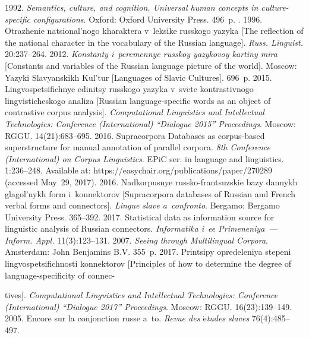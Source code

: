 \begin{multicols}{2}
{{\begin{thebibliography}{99}
   1992. \textit{Semantics, culture, and cognition. Universal 
human concepts in culture-specific configurations}. Oxford: Oxford University Press. 
496~p.
. 1996. Otrazhenie natsional'nogo 
kharaktera v~leksike russkogo yazyka [The reflection of the national character in the 
vocabulary of the Russian language]. \textit{Russ. Linguist.} 20:237--264.
   2012. 
\textit{Konstanty i~peremennye russkoy yazykovoy kartiny mira} [Constants and 
variables of the Russian language picture of the world]. Moscow: Yazyki 
Slavyanskikh Kul'tur [Languages of Slavic Cultures]. 696~p.
   2015. Lingvospetsifichnye edinitsy russkogo yazyka 
v~svete kontrastivnogo lingvisticheskogo analiza [Russian language-specific words 
as an object of contrastive corpus analysis]. \textit{Computational Linguistics and 
Intellectual Technologies: Conference (International) ``Dialogue 2015'' 
Proceedings}. Moscow: RGGU. 14(21):683--695.
   2016. Supracorpora Databases as corpus-based 
superstructure for manual annotation of parallel corpora. \textit{8th Conference 
(International) on Corpus %
Linguistics}. EPiC ser. in language and linguistics.  
1:236--248. Available at: {\sf https://easychair.org/publications/\linebreak paper/270289} (accessed 
May~29, 2017).
   2016. Nadkorpusnye russko-frantsuzskie 
bazy dannykh glagol'nykh form i~konnektorov [Supracorpora databases of Russian 
and French verbal forms and connectors]. \textit{Lingue slave a~confronto}. 
Bergamo: Bergamo University Press.  365--392.
   2017. Statistical data as information source 
for linguistic analysis of Russian connectors. \textit{Informatika i~ee  
Primeneniya~--- Inform. Appl.} 11(3):123--131.
   2007. \textit{Seeing through Multilingual Corpora}. 
Amsterdam: John Benjamins B.V. 355~p.
   2017. Printsipy opredeleniya stepeni lingvospetsifichnosti 
konnektorov [Principles of how to determine the degree of language-specificity of 
connec-\linebreak \vspace*{-10pt}
\pagebreak

\noindent
tives]. \textit{Computational Linguistics and Intellectual Technologies: 
Conference (International) ``Dialogue 2017'' Proceedings}. Moscow: RGGU. 
16(23):139--149.
   2005. Encore sur la conjonction russe a~to. 
  \textit{Revue des $\acute{\mbox{e}}$tudes 
slaves} 76(4):485--497.



\end{thebibliography}}}
\end{multicols}
